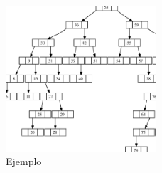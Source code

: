 \begin{figure}[!th]
\begin{center}
\includegraphics[width=0.5\textwidth]{images/arbolbinario.eps}
\caption{Ejemplo}
\label{fig:ArbolBinario}
\end{center}
\end{figure}

